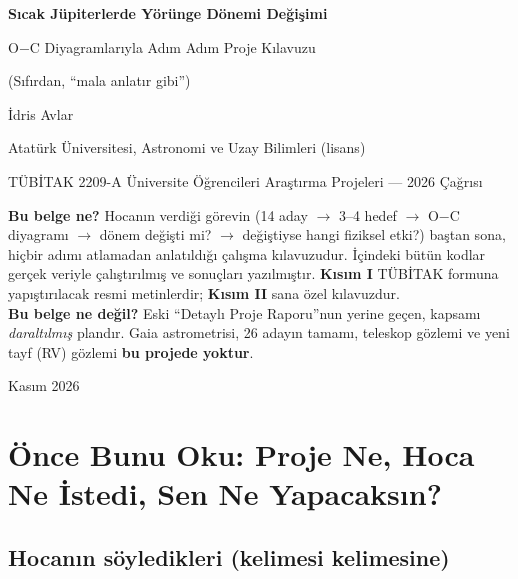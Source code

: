 \documentclass[11pt,a4paper]{article}
\begin{document}
\begin{titlepage}
\centering
\vspace*{1.5cm}
{\LARGE\bfseries Sıcak Jüpiterlerde Yörünge Dönemi Değişimi\par}
\vspace{0.4cm}
{\Large O$-$C Diyagramlarıyla Adım Adım Proje Kılavuzu\par}
\vspace{0.3cm}
{\large (Sıfırdan, “mala anlatır gibi”)\par}
\vspace{1.2cm}
{\large İdris Avlar\par}
{Atatürk Üniversitesi, Astronomi ve Uzay Bilimleri (lisans)\par}
\vspace{0.6cm}
{TÜBİTAK 2209-A Üniversite Öğrencileri Araştırma Projeleri — 2026 Çağrısı\par}
\vspace{1.5cm}
\begin{tcolorbox}[colback=white,colframe=black!60,width=0.9\textwidth]
\small
\textbf{Bu belge ne?} Hocanın verdiği görevin (14 aday $\rightarrow$ 3–4 hedef $\rightarrow$ O$-$C diyagramı
$\rightarrow$ dönem değişti mi? $\rightarrow$ değiştiyse hangi fiziksel etki?) baştan sona, hiçbir adımı atlamadan
anlatıldığı çalışma kılavuzudur. İçindeki bütün kodlar gerçek veriyle çalıştırılmış ve sonuçları
yazılmıştır. \textbf{Kısım I} TÜBİTAK formuna yapıştırılacak resmi metinlerdir; \textbf{Kısım II} sana özel kılavuzdur.\\[0.4em]
\textbf{Bu belge ne değil?} Eski “Detaylı Proje Raporu”nun yerine geçen, kapsamı \emph{daraltılmış} plandır.
Gaia astrometrisi, 26 adayın tamamı, teleskop gözlemi ve yeni tayf (RV) gözlemi \textbf{bu projede yoktur}.
\end{tcolorbox}
\vfill
{\small Kasım 2026}
\end{titlepage}

\tableofcontents
\newpage

\section{Önce Bunu Oku: Proje Ne, Hoca Ne İstedi, Sen Ne Yapacaksın?}

\subsection{Hocanın söyledikleri (kelimesi kelimesine)}
\end{document}
